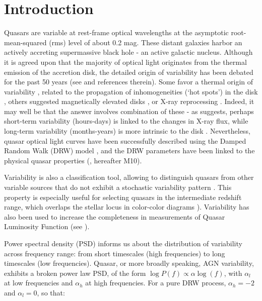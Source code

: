 \documentclass[twocolumn]{aastex62}
\begin{document}
\section{Introduction}

Quasars are variable at rest-frame optical wavelengths at the asymptotic root-mean-squared (rms) level of about 0.2 mag. These distant galaxies harbor an actively accreting supermassive black hole - an active galactic nucleus. Although it is agreed upon that the majority of optical light originates from the thermal emission of the accretion disk, the detailed origin of variability has been debated for the past 50 years (see \citealt{sun2018} and references therein). Some favor a thermal origin of variability \citep{kelly2013}, related to the propagation of inhomogeneities (`hot spots') in the disk \citep{dexter2011, cai2016}, others suggested magnetically elevated disks \citep{dexter2019}, or X-ray reprocessing  \citep{kubota2018}.  Indeed, it may well be that the answer involves combination of these -  as \cite{sanchez2018} suggests, perhaps short-term variability (hours-days) is linked to the changes in X-ray flux, while long-term variability (months-years) is more intrinsic to the disk \citep{edelson2015,lira2015}. Nevertheless, quasar optical light curves have been successfully described using the Damped Random Walk (DRW) model \citep{kelly2009, macleod2010, kozlowski2010, zu2011, kasliwal2015a}, and the DRW parameters have been linked to the physical quasar properties (\citealt{macleod2010}, hereafter M10). 

Variability is also a classification tool, allowing to distinguish quasars from other variable sources that do not exhibit a stochastic variability pattern \citep{macleod2011}. This property is especially useful for selecting quasars in the intermediate redshift range, which overlaps the stellar locus in color-color diagrams \citep{sesar2007, yang2017}). Variability has also been used to increase the completeness in measurements of Quasar Luminosity Function (see \citealt{ ross2013, palanque2013, alsayyad2016, mcgreer2013, mcgreer2018}). 

Power spectral density (PSD) informs us about the distribution of variability across frequency range: from short timescales (high frequencies) to long timescales (low frequencies). Quasar, or more broadly speaking, AGN variability, exhibits a broken power law PSD, of the form 
$\log{P(f)} \propto \alpha \log{(f)}$, with $\alpha_l$ at low frequencies and $\alpha_h$ at high frequencies. For a pure DRW process,  $\alpha_{h}{=}-2$ and $\alpha_{l}{=}0$, so that:
\end{document}
